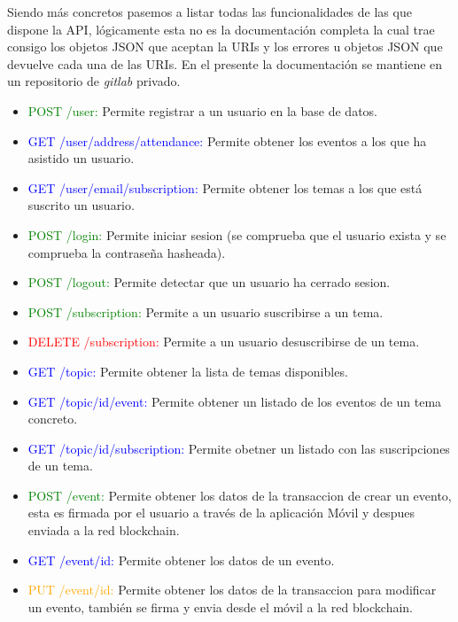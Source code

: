Siendo más concretos pasemos a listar todas las funcionalidades de las que dispone la API, lógicamente esta no es la documentación completa la cual trae consigo los objetos JSON que aceptan la URIs y los errores u objetos JSON que devuelve cada una de las URIs. En el presente la documentación se mantiene en un repositorio de \emph{gitlab} privado. \\

\begin{itemize}
\item \textcolor{green}{{\footnotesize POST} /user:} Permite registrar a un usuario en la base de datos.
\item \textcolor{blue}{{\footnotesize GET} /user/{address}/attendance:} Permite obtener los eventos a los que ha asistido un usuario.
\item \textcolor{blue}{{\footnotesize GET} /user/{email}/subscription:} Permite obtener los temas a los que está suscrito un usuario.
\item \textcolor{green}{{\footnotesize POST} /login:} Permite iniciar sesion (se comprueba que el usuario exista y se comprueba la contraseña hasheada).
\item \textcolor{green}{{\footnotesize POST} /logout:} Permite detectar que un usuario ha cerrado sesion.
\item \textcolor{green}{{\footnotesize POST} /subscription:} Permite a un usuario suscribirse a un tema.
\item \textcolor{red}{{\footnotesize DELETE} /subscription:} Permite a un usuario desuscribirse de un tema.
\item \textcolor{blue}{{\footnotesize GET} /topic:} Permite obtener la lista de temas disponibles.
\item \textcolor{blue}{{\footnotesize GET} /topic/{id}/event:} Permite obtener un listado de los eventos de un tema concreto.
\item \textcolor{blue}{{\footnotesize GET} /topic/{id}/subscription:} Permite obetner un listado con las suscripciones de un tema.
\item \textcolor{green}{{\footnotesize POST} /event:} Permite obtener los datos de la transaccion de crear un evento, esta es firmada por el usuario a través de la aplicación Móvil y despues enviada a la red blockchain. 
\item \textcolor{blue}{{\footnotesize GET} /event/{id}:} Permite obtener los datos de un evento.
\item \textcolor{orange}{{\footnotesize PUT} /event/{id}:} Permite obtener los datos de la transaccion para modificar un evento, también se firma y envia desde el móvil a la red blockchain. 

\end{itemize}
